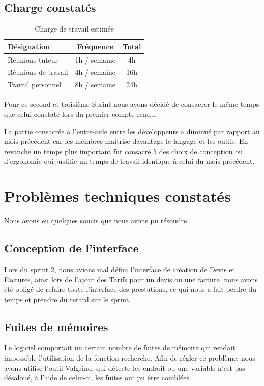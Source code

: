\documentclass[12pt,a4paper,openany]{article}
\begin{document}
	\subsection{Charge constatés}
	\begin{table}[H]
		\centering
		\begin{tabular}{l|c|c}
			\textbf{Désignation} & \textbf{Fréquence} & \textbf{Total}\\
			\hline
			Réunions tuteur & 1h / semaine & 4h\\
			Réunions de travail & 4h / semaine & 16h\\
			Travail personnel & 8h / semaine & 24h
		\end{tabular}
		\caption{Charge de travail estimée}
	\end{table}
	Pour ce second et troisième Sprint nous avons décidé de consacrer le même temps que celui constaté lors du premier compte rendu. 
	
	La partie consacrée à l'entre-aide entre les développeurs a diminué par rapport au mois précédent car les membres maîtrise davantage le langage et les outils. En revanche un temps plus important fut consacré à des choix de conception ou d'ergonomie qui justifie un temps de travail identique à celui du mois précédent.

	\section{Problèmes techniques constatés}
	Nous avons eu quelques soucis que nous avons pu résoudre.

	\subsection{Conception de l'interface}
	Lors du sprint 2, nous avions mal défini l'interface de création de Devis et Factures, ainsi lors de l'ajout des Tarifs pour un devis ou une
	facture ,nous avons été obligé de refaire toute l'interface des prestations, ce qui nous a fait perdre du temps et prendre du retard sur le
	sprint.

	\subsection{Fuites de mémoires}
	Le logiciel comportait un certain nombre de fuites de mémoire qui rendait impossible l'utilisation de la fonction recherche. Afin de régler ce
	problème, nous avons utilisé l'outil Valgrind, qui détecte les endroit ou une variable n'est pas désaloué, à l'aide de celui-ci, les fuites ont pu
	être comblées.
\end{document}
